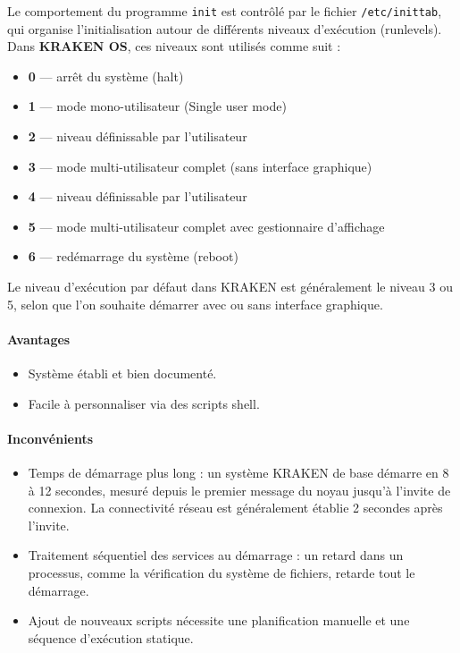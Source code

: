 

Le comportement du programme \texttt{init} est contrôlé par le fichier \texttt{/etc/inittab}, qui organise l'initialisation autour de différents niveaux d'exécution (runlevels). Dans \textbf{KRAKEN OS}, ces niveaux sont utilisés comme suit :

\begin{itemize}
  \item \textbf{0} — arrêt du système (halt)
  \item \textbf{1} — mode mono-utilisateur (Single user mode)
  \item \textbf{2} — niveau définissable par l'utilisateur
  \item \textbf{3} — mode multi-utilisateur complet (sans interface graphique)
  \item \textbf{4} — niveau définissable par l'utilisateur
  \item \textbf{5} — mode multi-utilisateur complet avec gestionnaire d'affichage
  \item \textbf{6} — redémarrage du système (reboot)
\end{itemize}

Le niveau d'exécution par défaut dans KRAKEN est généralement le niveau 3 ou 5, selon que l'on souhaite démarrer avec ou sans interface graphique.

\paragraph{Avantages}

\begin{itemize}
  \item Système établi et bien documenté.
  \item Facile à personnaliser via des scripts shell.
\end{itemize}

\paragraph{Inconvénients}

\begin{itemize}
  \item Temps de démarrage plus long : un système KRAKEN de base démarre en 8 à 12 secondes, mesuré depuis le premier message du noyau jusqu'à l'invite de connexion. La connectivité réseau est généralement établie 2 secondes après l'invite.
  \item Traitement séquentiel des services au démarrage : un retard dans un processus, comme la vérification du système de fichiers, retarde tout le démarrage.
  
  \item Ajout de nouveaux scripts nécessite une planification manuelle et une séquence d'exécution statique.
\end{itemize}
